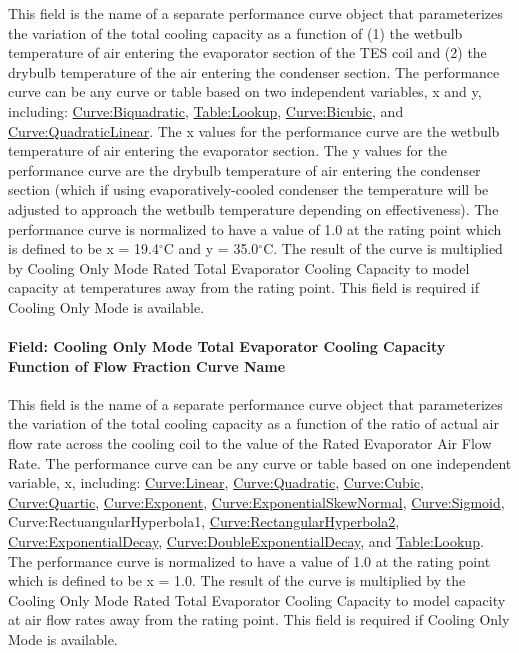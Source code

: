 This field is the name of a separate performance curve object that parameterizes the variation of the total cooling capacity as a function of (1) the wetbulb temperature of air entering the evaporator section of the TES coil and (2) the drybulb temperature of the air entering the condenser section. The performance curve can be any curve or table based on two independent variables, x and y, including: \hyperref[curvebiquadratic]{Curve:Biquadratic}, \hyperref[tablelookup]{Table:Lookup}, \hyperref[curvebicubic]{Curve:Bicubic}, and \hyperref[curvequadraticlinear]{Curve:QuadraticLinear}. The x values for the performance curve are the wetbulb temperature of air entering the evaporator section. The y values for the performance curve are the drybulb temperature of air entering the condenser section (which if using evaporatively-cooled condenser the temperature will be adjusted to approach the wetbulb temperature depending on effectiveness). The performance curve is normalized to have a value of 1.0 at the rating point which is defined to be x = 19.4$^\circ$C and y = 35.0$^\circ$C. The result of the curve is multiplied by Cooling Only Mode Rated Total Evaporator Cooling Capacity to model capacity at temperatures away from the rating point. This field is required if Cooling Only Mode is available.

\paragraph{Field: Cooling Only Mode Total Evaporator Cooling Capacity Function of Flow Fraction Curve Name}\label{field-cooling-only-mode-total-evaporator-cooling-capacity-function-of-flow-fraction-curve-name}

This field is the name of a separate performance curve object that parameterizes the variation of the total cooling capacity as a function of the ratio of actual air flow rate across the cooling coil to the value of the Rated Evaporator Air Flow Rate. The performance curve can be any curve or table based on one independent variable, x, including: \hyperref[curvelinear]{Curve:Linear}, \hyperref[curvequadratic]{Curve:Quadratic}, \hyperref[curvecubic]{Curve:Cubic}, \hyperref[curvequartic]{Curve:Quartic}, \hyperref[curveexponent]{Curve:Exponent}, \hyperref[curveexponentialskewnormal]{Curve:ExponentialSkewNormal}, \hyperref[curvesigmoid]{Curve:Sigmoid}, Curve:RectuangularHyperbola1, \hyperref[curverectangularhyperbola2]{Curve:RectangularHyperbola2}, \hyperref[curveexponentialdecay]{Curve:ExponentialDecay}, \hyperref[curvedoubleexponentialdecay]{Curve:DoubleExponentialDecay}, and \hyperref[tablelookup]{Table:Lookup}. The performance curve is normalized to have a value of 1.0 at the rating point which is defined to be x = 1.0. The result of the curve is multiplied by the Cooling Only Mode Rated Total Evaporator Cooling Capacity to model capacity at air flow rates away from the rating point. This field is required if Cooling Only Mode is available.


